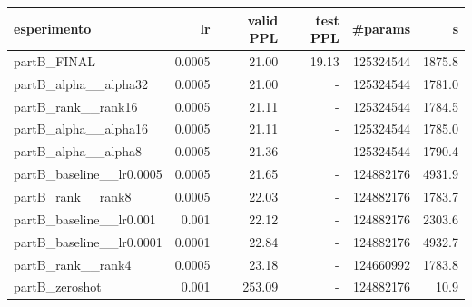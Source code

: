\begin{tabular}{lrrrrr}
\toprule
esperimento & lr & valid PPL & test PPL & \#params & s \\
\midrule
partB\_FINAL & 0.0005 & 21.00 & 19.13 & 125324544 & 1875.8 \\
partB\_alpha\_\_alpha32 & 0.0005 & 21.00 & - & 125324544 & 1781.0 \\
partB\_rank\_\_rank16 & 0.0005 & 21.11 & - & 125324544 & 1784.5 \\
partB\_alpha\_\_alpha16 & 0.0005 & 21.11 & - & 125324544 & 1785.0 \\
partB\_alpha\_\_alpha8 & 0.0005 & 21.36 & - & 125324544 & 1790.4 \\
partB\_baseline\_\_lr0.0005 & 0.0005 & 21.65 & - & 124882176 & 4931.9 \\
partB\_rank\_\_rank8 & 0.0005 & 22.03 & - & 124882176 & 1783.7 \\
partB\_baseline\_\_lr0.001 & 0.001 & 22.12 & - & 124882176 & 2303.6 \\
partB\_baseline\_\_lr0.0001 & 0.0001 & 22.84 & - & 124882176 & 4932.7 \\
partB\_rank\_\_rank4 & 0.0005 & 23.18 & - & 124660992 & 1783.8 \\
partB\_zeroshot & 0.001 & 253.09 & - & 124882176 & 10.9 \\
\bottomrule
\end{tabular}